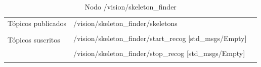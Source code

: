 \documentclass[user_manual.tex]{subfiles}
\begin{document}
\begin{table}[H]
\begin{center}
\begin{tabular}{|l|p{6cm}|p{5cm}|}%
\hline

Tópicos publicados
& /vision/skeleton\_finder/skeletons  &  \\
& & \\
\hline

\multirow{2}{*}{Tópicos suscritos}
& /vision/skeleton\_finder/start\_recog [std\_msgs/Empty] &  \\
& & \\
& /vision/skeleton\_finder/stop\_recog [std\_msgs/Empty] &  \\
& & \\
\cline{1-3}
 
\end{tabular}
\caption{Nodo /vision/skeleton\_finder}
\label{skeleton finder node}
\end{center}
\end{table}

\end{document}
